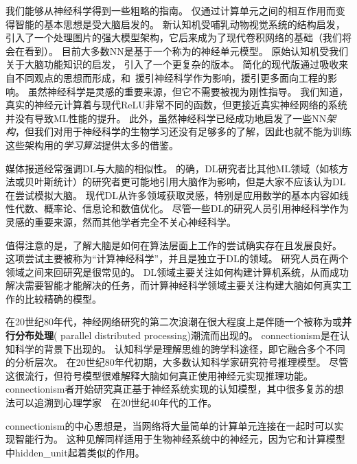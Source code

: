我们能够从神经科学得到一些粗略的指南。
仅通过计算单元之间的相互作用而变得智能的基本思想是受大脑启发的。
新认知机\citep{Fukushima80}受哺乳动物视觉系统的结构启发，引入了一个处理图片的强大模型架构，它后来成为了现代卷积网络的基础\citep{LeCun98-small}（我们将会在看到）。
目前大多数\gls{NN}是基于一个称为的神经单元模型。
原始认知机\citep{Fukushima75}受我们关于大脑功能知识的启发， 引入了一个更复杂的版本。
简化的现代版通过吸收来自不同观点的思想而形成，\citet{Nair-2010}和~\citet{Glorot+al-AI-2011-small}援引神经科学作为影响，\citet{Jarrett-ICCV2009}援引更多面向工程的影响。
虽然神经科学是灵感的重要来源，但它不需要被视为刚性指导。
我们知道，真实的神经元计算着与现代\gls{ReLU}非常不同的函数，但更接近真实神经网络的系统并没有导致\gls{ML}性能的提升。
此外，虽然神经科学已经成功地启发了一些\gls{NN}\emph{架构}，但我们对用于神经科学的生物学习还没有足够多的了解，因此也就不能为训练这些架构用的\emph{学习算法}提供太多的借鉴。


媒体报道经常强调\gls{DL}与大脑的相似性。
的确，\gls{DL}研究者比其他\gls{ML}领域（如核方法或贝叶斯统计）的研究者更可能地引用大脑作为影响，但是大家不应该认为\gls{DL}在尝试模拟大脑。
现代\gls{DL}从许多领域获取灵感，特别是应用数学的基本内容如线性代数、概率论、信息论和数值优化。
尽管一些\gls{DL}的研究人员引用神经科学作为灵感的重要来源，然而其他学者完全不关心神经科学。


值得注意的是，了解大脑是如何在算法层面上工作的尝试确实存在且发展良好。
这项尝试主要被称为``计算神经科学''，并且是独立于\gls{DL}的领域。
研究人员在两个领域之间来回研究是很常见的。
\gls{DL}领域主要关注如何构建计算机系统，从而成功解决需要智能才能解决的任务，而计算神经科学领域主要关注构建大脑如何真实工作的比较精确的模型。

在20世纪80年代，神经网络研究的第二次浪潮在很大程度上是伴随一个被称为或\textbf{并行分布处理}( parallel distributed processing)潮流而出现的\citep{Rumelhart86,mcclelland_appeal_1986}。
\gls{connectionism}是在认知科学的背景下出现的。
认知科学是理解思维的跨学科途径，即它融合多个不同的分析层次。
在20世纪80年代初期，大多数认知科学家研究符号推理模型。
尽管这很流行，但符号模型很难解释大脑如何真正使用神经元实现推理功能。 
\gls{connectionism}者开始研究真正基于神经系统实现的认知模型\citep{Touretzky1985}，其中很多复苏的想法可以追溯到心理学家~~在20世纪40年代的工作\citep{Hebb49}。

\gls{connectionism}的中心思想是，当网络将大量简单的计算单元连接在一起时可以实现智能行为。
这种见解同样适用于生物神经系统中的神经元，因为它和计算模型中\gls{hidden_unit}起着类似的作用。

